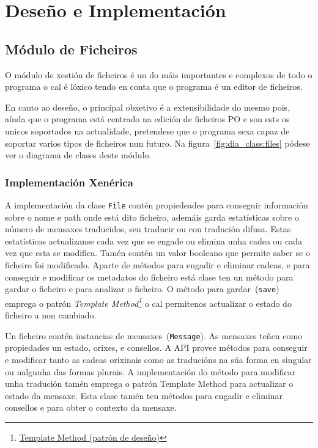 \chapter{Deseño e Implementación}

\section{Módulo de Ficheiros}

O módulo de xestión de ficheiros é un do máis importantes e complexos de todo o programa o cal é lóxico tendo en conta que o programa é un editor de ficheiros.

En canto ao deseño, o principal obxetivo é a extensibilidade do mesmo pois, aínda que o programa está centrado na edición de ficheiros PO e son ests os unicos soportados na actualidade, pretendese que o programa sexa capaz de soportar varios tipos de ficheiros nun futuro. Na figura~\ref{fig:dia_class:files} pódese ver o diagrama de clases deste módulo.

\subsection{Implementación Xenérica}
A implementación da clase \lstinline{File} contén propiedeades para conseguir información sobre o nome e path onde está dito ficheiro, ademáis garda estatísticas sobre o número de mensaxes traducidos, sen traducir ou con tradución difusa. Estas estatísticas actualizanse cada vez que se engade ou elimina unha cadea ou cada vez que esta se modifica. Tamén contén un valor booleano que permite saber se o ficheiro foi modificado. Aparte de métodos para engadir e eliminar cadeas, e para conseguir e modificar os metadatos do ficheiro está clase ten un método para gardar o ficheiro e para analizar o ficheiro. O método para gardar~(\lstinline{save}) emprega o patrón \emph{Template Method\footnote{\href{http://gl.wikipedia.org/wiki/Template_Method_\%28patr\%C3\%B3n_de_dese\%C3\%B1o\%29}{Template Method (patrón de deseño)}}} o cal permitenos actualizar o estado do ficheiro a non cambiado.

Un ficheiro contén instancias de mensaxes~(\lstinline{Message}). As mensaxes teñen como propiedades un estado, orixes, e consellos. A API provee métodos para conseguir e modificar tanto as cadeas orixinais como as traducións na súa forma en singular ou nalgunha das formas plurais. A implementación do método para modificar unha tradución tamén emprega o patrón Template Method para actualizar o estado da mensaxe. Esta clase tamén ten métodos para engadir e eliminar consellos e para obter o contexto da mensaxe.

